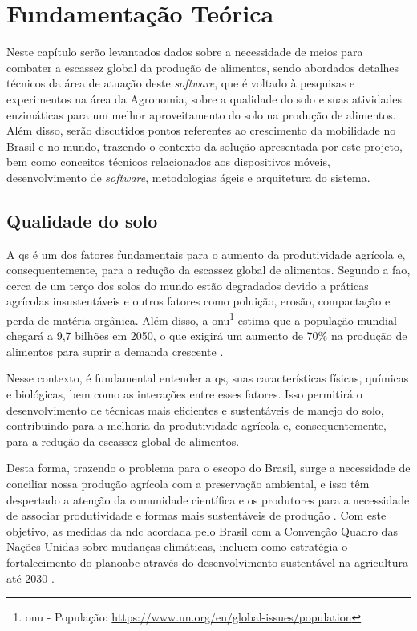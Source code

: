 \chapter{Fundamentação Teórica}\label{ch:teoria}
Neste capítulo serão levantados dados sobre a necessidade de meios para combater a escassez global da produção de alimentos, sendo abordados detalhes técnicos da área de atuação deste \textit{software}, que é voltado à pesquisas e experimentos na área da Agronomia, sobre a qualidade do solo e suas atividades enzimáticas para um melhor aproveitamento do solo na produção de alimentos. Além disso, serão discutidos pontos referentes ao crescimento da mobilidade no Brasil e no mundo, trazendo o contexto da solução apresentada por este projeto, bem como conceitos técnicos relacionados aos dispositivos móveis, desenvolvimento de \textit{software}, metodologias ágeis e arquitetura do sistema.

\section{Qualidade do solo}\label{sec:qualidade_solo}
A \ac{qs} é um dos fatores fundamentais para o aumento da produtividade agrícola e, consequentemente, para a redução da escassez global de alimentos. Segundo a \ac{fao}, cerca de um terço dos solos do mundo estão degradados devido a práticas agrícolas insustentáveis e outros fatores como poluição, erosão, compactação e perda de matéria orgânica. Além disso, a \ac{onu}\footnote{\ac{onu} - População: \url{https://www.un.org/en/global-issues/population}} estima que a população mundial chegará a 9,7 bilhões em 2050, o que exigirá um aumento de 70\% na produção de alimentos para suprir a demanda crescente \citet{fao2018future}.

Nesse contexto, é fundamental entender a \ac{qs}, suas características físicas, químicas e biológicas, bem como as interações entre esses fatores. Isso permitirá o desenvolvimento de técnicas mais eficientes e sustentáveis de manejo do solo, contribuindo para a melhoria da produtividade agrícola e, consequentemente, para a redução da escassez global de alimentos.

Desta forma, trazendo o problema para o escopo do Brasil, surge a necessidade de conciliar nossa produção agrícola com a preservação ambiental, e isso têm despertado a atenção da comunidade científica e os produtores para a necessidade de associar produtividade e formas mais sustentáveis de produção \citet{lopez2019carbon}. Com este objetivo, as medidas da \ac{ndc} acordada pelo Brasil com a Convenção Quadro das Nações Unidas sobre mudanças climáticas, incluem como estratégia o fortalecimento do \ac{planoabc} através do desenvolvimento sustentável na agricultura até 2030 \citet{embrapa_visao_2030}.

